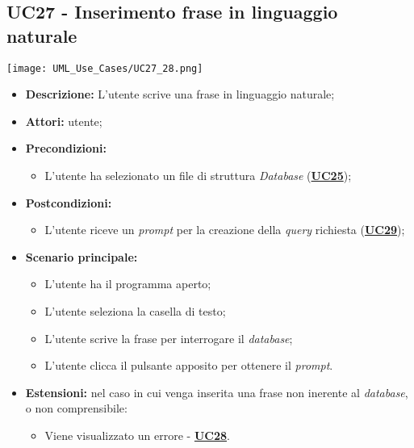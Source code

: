 \subsection{UC27 - Inserimento frase in linguaggio naturale}
\label{sec:UC27}
\texttt{[image: UML\_Use\_Cases/UC27\_28.png]}
\begin{itemize}
	\item \textbf{Descrizione:} L’utente scrive una frase in linguaggio naturale;
	\item \textbf{Attori:} utente;
	\item \textbf{Precondizioni:} 
	\begin{itemize}
		\item L’utente ha selezionato un file di struttura \textit{Database} (\hyperref[sec:UC25]{\textbf{UC25}});
	\end{itemize}
	\item \textbf{Postcondizioni:} 
	\begin{itemize}
		\item L’utente riceve un \textit{prompt} per la creazione della \textit{query} richiesta (\hyperref[sec:UC29]{\textbf{UC29}});
	\end{itemize}
	\item \textbf{Scenario principale:} 
	\begin{itemize}
		\item L’utente ha il programma aperto;
		\item L’utente seleziona la casella di testo;
		\item L’utente scrive la frase per interrogare il \textit{database};
		\item L’utente clicca il pulsante apposito per ottenere il \textit{prompt}.
	\end{itemize}
	\item \textbf{Estensioni:} nel caso in cui venga inserita una frase non inerente al \textit{database}, o non comprensibile:
	\begin{itemize}
		\item Viene visualizzato un errore - \hyperref[sec:UC28]{\textbf{UC28}}.
	\end{itemize}
\end{itemize}

